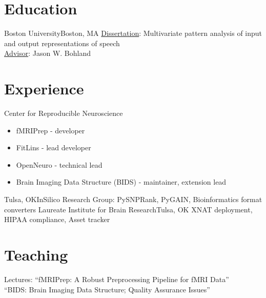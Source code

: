\documentclass[11pt,letterpaper,sans]{moderncv}
\begin{document}
\makecvtitle

\section{Education}
%
    {Boston University}{Boston, MA}{}%
    {\underline{Dissertation}: Multivariate pattern analysis of input and output
     representations of speech\\
     \underline{Advisor}: Jason W. Bohland}

\section{Experience}
%
    {Center for Reproducible Neuroscience
\begin{itemize}
  \item fMRIPrep - developer
  \item FitLins - lead developer
  \item OpenNeuro - technical lead
  \item Brain Imaging Data Structure (BIDS) - maintainer, extension lead
\end{itemize}}
%
    {Tulsa, OK}{}{InSilico Research Group: PySNPRank, PyGAIN, Bioinformatics format converters}
%
    {Laureate Institute for Brain Research}{Tulsa, OK}{}%
    {XNAT deployment, HIPAA compliance, Asset tracker}

\section{Teaching}
%
    {Lectures: ``fMRIPrep: A Robust Preprocessing Pipeline for fMRI Data''\\
     ``BIDS: Brain Imaging Data Structure; Quality Assurance Issues''}
\end{document}
